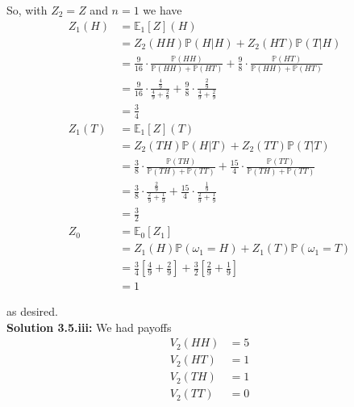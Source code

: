 \documentclass[12pt]{article}
\renewcommand{\P}{\mathbb P}
\newcommand{\E}{\mathbb E}
\begin{document}
So, with $Z_2 = Z$ and $n = 1$ we have
\begin{align*}
	Z_1(H) &= \E_1[Z](H) \\
	&= Z_2(HH)\P(H|H) + Z_2(HT)\P(T|H) \\
	&= \frac{9}{16} \cdot \frac{ \P(HH) }{ \P(HH) + \P(HT) } + \frac{9}{8} \cdot \frac{ \P(HT) }{ \P(HH) + \P(HT) }  \\
	&= \frac{9}{16} \cdot \frac{ \frac{4}{9} }{ \frac{4}{9} + \frac{2}{9} } + \frac{9}{8} \cdot \frac{ \frac{2}{9} }{ \frac{4}{9} + \frac{2}{9} }   \\
	&= \frac{3}{4} \\
	Z_1(T) &= \E_1[Z](T) \\
	&= Z_2(TH)\P(H|T) + Z_2(TT)\P(T|T) \\
	&= \frac{3}{8} \cdot \frac{ \P(TH) }{ \P(TH) + \P(TT) } + \frac{15}{4} \cdot \frac{ \P(TT) }{ \P(TH) + \P(TT) }  \\
	&= \frac{3}{8} \cdot \frac{ \frac{2}{9} }{ \frac{2}{9} + \frac{1}{9} } + \frac{15}{4} \cdot \frac{ \frac{1}{9} }{ \frac{2}{9} + \frac{1}{9} }   \\
	&= \frac{3}{2} \\
	Z_0 &= \E_0[Z_1] \\
	&= Z_1(H)\P(\omega_1 = H) + Z_1(T)\P(\omega_1 = T) \\
	&= \frac{3}{4} \left[ \frac{4}{9} + \frac{2}{9} \right] + \frac{3}{2} \left[ \frac{2}{9} + \frac{1}{9} \right] \\
	&= 1
\end{align*}

as desired. \\

{\bf Solution 3.5.iii:} We had payoffs
\begin{align*}
	V_2(HH) &= 5 \\
	V_2(HT) &= 1 \\
	V_2(TH) &= 1 \\
	V_2(TT) &= 0
\end{align*}
\end{document}
